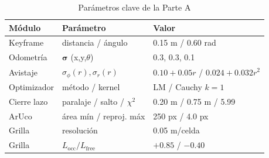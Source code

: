 \begin{table}[h]
\centering
\caption{Parámetros clave de la Parte A}
\label{tab:params_a}
\begin{tabular}{lll}
\toprule
\textbf{Módulo} & \textbf{Parámetro} & \textbf{Valor} \\
\midrule
Keyframe & distancia / ángulo & 0.15 m / 0.60 rad \\
Odometría & $\boldsymbol{\sigma}$ (x,y,$\theta$) & 0.3, 0.3, 0.1 \\
Avistaje & $\sigma_\phi(r),\sigma_r(r)$ & $0.10{+}0.05r$ / $0.024{+}0.032r^2$ \\
Optimizador & método / kernel & LM / Cauchy $k{=}1$ \\
Cierre lazo & paralaje / salto / $\chi^2$ & 0.20 m / 0.75 m / 5.99 \\
ArUco & área mín / reproj. máx & 250 px / 4.0 px \\
Grilla & resolución & 0.05 m/celda \\
Grilla & $L_{\text{occ}}/L_{\text{free}}$ & $+0.85$ / $-0.40$ \\
\bottomrule
\end{tabular}
\end{table}
